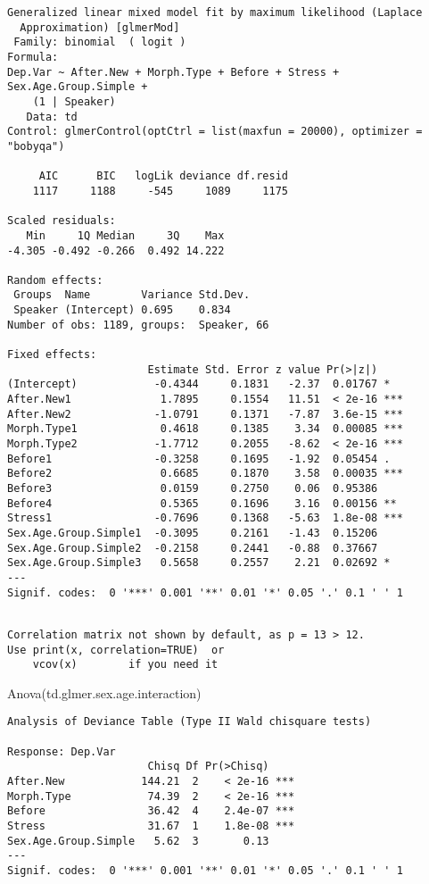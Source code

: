 \documentclass[
  10pt,
  letterpaper]{article}
\newenvironment{Shaded}{\begin{snugshade}}{\end{snugshade}}
\newcommand{\FunctionTok}[1]{\textcolor[rgb]{0.28,0.35,0.67}{#1}}
\newcommand{\NormalTok}[1]{\textcolor[rgb]{0.00,0.23,0.31}{#1}}
\begin{document}
\begin{verbatim}
Generalized linear mixed model fit by maximum likelihood (Laplace
  Approximation) [glmerMod]
 Family: binomial  ( logit )
Formula: 
Dep.Var ~ After.New + Morph.Type + Before + Stress + Sex.Age.Group.Simple +  
    (1 | Speaker)
   Data: td
Control: glmerControl(optCtrl = list(maxfun = 20000), optimizer = "bobyqa")

     AIC      BIC   logLik deviance df.resid 
    1117     1188     -545     1089     1175 

Scaled residuals: 
   Min     1Q Median     3Q    Max 
-4.305 -0.492 -0.266  0.492 14.222 

Random effects:
 Groups  Name        Variance Std.Dev.
 Speaker (Intercept) 0.695    0.834   
Number of obs: 1189, groups:  Speaker, 66

Fixed effects:
                      Estimate Std. Error z value Pr(>|z|)    
(Intercept)            -0.4344     0.1831   -2.37  0.01767 *  
After.New1              1.7895     0.1554   11.51  < 2e-16 ***
After.New2             -1.0791     0.1371   -7.87  3.6e-15 ***
Morph.Type1             0.4618     0.1385    3.34  0.00085 ***
Morph.Type2            -1.7712     0.2055   -8.62  < 2e-16 ***
Before1                -0.3258     0.1695   -1.92  0.05454 .  
Before2                 0.6685     0.1870    3.58  0.00035 ***
Before3                 0.0159     0.2750    0.06  0.95386    
Before4                 0.5365     0.1696    3.16  0.00156 ** 
Stress1                -0.7696     0.1368   -5.63  1.8e-08 ***
Sex.Age.Group.Simple1  -0.3095     0.2161   -1.43  0.15206    
Sex.Age.Group.Simple2  -0.2158     0.2441   -0.88  0.37667    
Sex.Age.Group.Simple3   0.5658     0.2557    2.21  0.02692 *  
---
Signif. codes:  0 '***' 0.001 '**' 0.01 '*' 0.05 '.' 0.1 ' ' 1
\end{verbatim}

\begin{verbatim}

Correlation matrix not shown by default, as p = 13 > 12.
Use print(x, correlation=TRUE)  or
    vcov(x)        if you need it
\end{verbatim}

\begin{Shaded}
\begin{Highlighting}[]
\FunctionTok{Anova}\NormalTok{(td.glmer.sex.age.interaction)}
\end{Highlighting}
\end{Shaded}

\begin{verbatim}
Analysis of Deviance Table (Type II Wald chisquare tests)

Response: Dep.Var
                      Chisq Df Pr(>Chisq)    
After.New            144.21  2    < 2e-16 ***
Morph.Type            74.39  2    < 2e-16 ***
Before                36.42  4    2.4e-07 ***
Stress                31.67  1    1.8e-08 ***
Sex.Age.Group.Simple   5.62  3       0.13    
---
Signif. codes:  0 '***' 0.001 '**' 0.01 '*' 0.05 '.' 0.1 ' ' 1
\end{verbatim}
\end{document}
